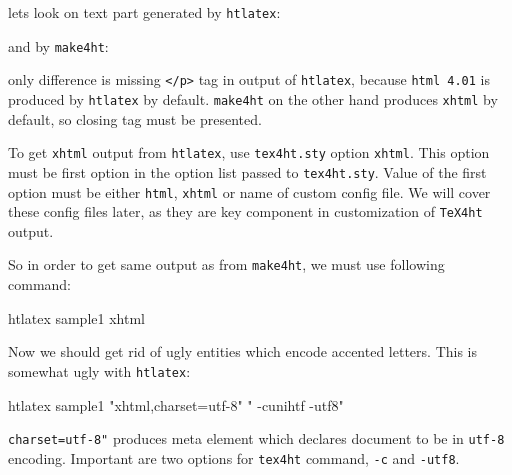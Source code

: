 lets look on text part generated by \texttt{htlatex}:


and by \texttt{make4ht}:


only difference is missing \texttt{\textless{}/p\textgreater{}} tag in
output of \texttt{htlatex}, because \texttt{html\ 4.01} is produced by
\texttt{htlatex} by default. \texttt{make4ht} on the other hand produces
\texttt{xhtml} by default, so closing tag must be presented.

To get \texttt{xhtml} output from \texttt{htlatex}, use
\texttt{tex4ht.sty} option \texttt{xhtml}. This option must be first
option in the option list passed to \texttt{tex4ht.sty}. Value of the
first option must be either \texttt{html}, \texttt{xhtml} or name of
custom config file. We will cover these config files later, as they are
key component in customization of \texttt{TeX4ht} output.

So in order to get same output as from \texttt{make4ht}, we must use
following command:

\begin{shellcommand}
htlatex sample1 xhtml
\end{shellcommand}

Now we should get rid of ugly entities which encode accented letters.
This is somewhat ugly with \texttt{htlatex}:

\begin{shellcommand}
htlatex sample1 "xhtml,charset=utf-8" " -cunihtf -utf8"
\end{shellcommand}

\texttt{charset=utf-8"} produces meta element which declares document to
be in \texttt{utf-8} encoding. Important are two options for
\texttt{tex4ht} command, \texttt{-c} and \texttt{-utf8}.

